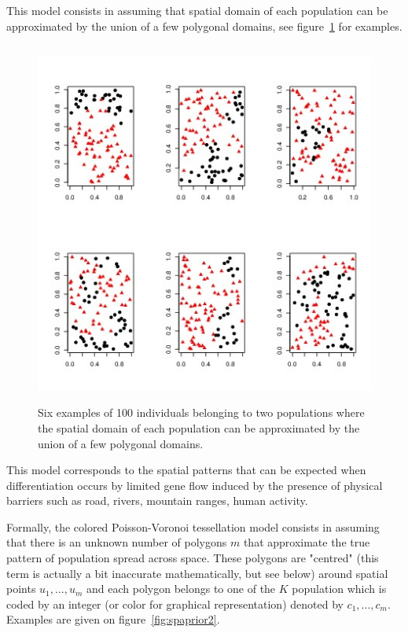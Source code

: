 \documentclass{article}
\begin{document}
This model consists in assuming that spatial domain of each population can be approximated by the union of a few polygonal domains, 
see figure~\ref{fig:spaprior} for examples. 

\begin{figure}[h]
\includegraphics[height=12cm,width=17cm]{../inst/images/example_spatial2_bis.jpeg}
\caption{Six examples of 100 individuals belonging to two populations  where the 
spatial domain of each population can be approximated by the union of a few polygonal domains. }\label{fig:spaprior}
\end{figure}


This model corresponds to the spatial patterns that can be expected when differentiation occurs by limited gene flow induced by the presence 
of physical barriers such as road, rivers, mountain ranges, human activity.

Formally, the colored Poisson-Voronoi tessellation model consists in assuming that there is an unknown number of polygons $m$ 
that approximate the true pattern of population spread across space. 
These polygons are "centred" (this term is actually a bit inaccurate mathematically, but see below) around spatial points 
$u_1,...,u_m$ and each polygon belongs to one of the $K$ population which is coded by an integer (or color for graphical representation) 
denoted by $c_1,...,c_m$. Examples are given on figure~\ref{fig:spaprior2}. 
\end{document}
